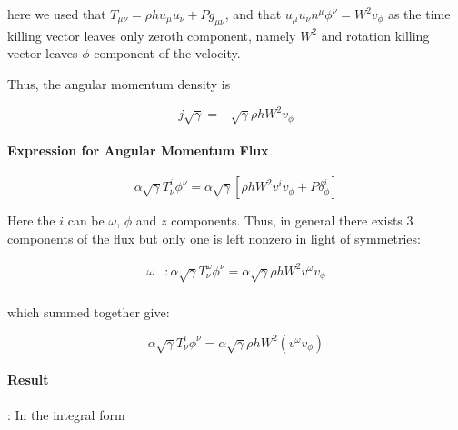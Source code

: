 here we used that $T_{\mu\nu} = \rho h u_{\mu} u_{\nu} + Pg_{\mu\nu}$, and that $u_{\mu}u_{\nu}n^{\mu}\phi^{\nu} = W^2 v_{\phi}$ as the time killing vector leaves only zeroth component, namely $W^2$ and rotation killing vector leaves $\phi$ component of the velocity. 

Thus, the angular momentum density is 

\begin{equation}
j\sqrt{\gamma} = -\sqrt{\gamma} \rho h W^2 v_{\phi}
\end{equation}

\paragraph{Expression for Angular Momentum Flux}  

\begin{equation}
\alpha\sqrt{\gamma}T^i _{\nu}\phi^{\nu} = \alpha\sqrt{\gamma}[\rho h W^2 v^i v_{\phi} + P\delta^i _{\phi}]
\end{equation}

Here the $i$ can be $\omega$, $\phi$ and $z$ components. Thus, in general there exists $3$ components of the flux but only one is left nonzero in light of symmetries:

\begin{align}
\omega &: \alpha\sqrt{\gamma}T^{\omega}_{\nu}\phi^{\nu} = \alpha\sqrt{\gamma}\rho h W^2 v^{\omega}v_{\phi} \\
\end{align}

which summed together give:


\begin{equation}
\alpha\sqrt{\gamma}T^i _{\nu}\phi^{\nu} = \alpha\sqrt{\gamma}\rho h W^2 (v^{\omega}v_{\phi})
\end{equation}

\paragraph{Result}: In the integral form 

